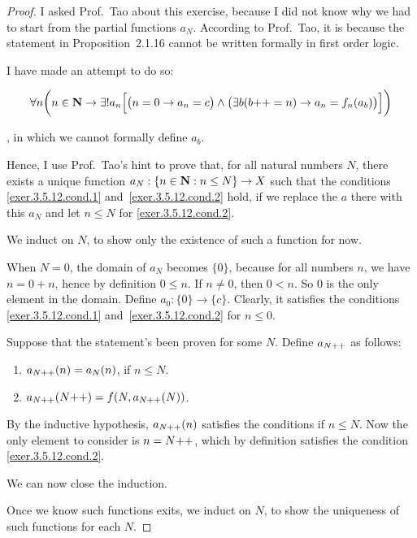 \noindent{}
\begin{proof}
	I asked Prof.~Tao about this exercise, because I did not know why we had to start from the partial functions $a_N$. According to Prof.~Tao, it is because the statement in Proposition~2.1.16 cannot be written formally in first order logic.
	
	I have made an attempt to do so:
		
	\begin{equation}
		\forall n\bigg(n \in \mathbf{N} \to \exists!a_n\Bigl[\bigl(n = 0 \to a_n = c\bigr) \wedge \bigl(\exists b(b{+}{+} = n) \to a_n = f_n(a_b)\bigr)\Bigr]\bigg) \label{prop.2.1.16.formal.stat.1}
	\end{equation}
	
	, in which we cannot formally define $a_b$.
	
	Hence, I use Prof.~Tao's hint to prove that, for all natural numbers $N$, there exists a unique function $a_N : \{n \in \mathbf{N} : n \le N\} \to X$ such that the conditions \eqref{exer.3.5.12.cond.1} and~\eqref{exer.3.5.12.cond.2} hold, if we replace the $a$ there with this $a_N$ and let $n \le N$ for \eqref{exer.3.5.12.cond.2}.
	
	 We induct on $N$, to show only the existence of such a function for now.
	
	\mybcbox When $N = 0$, the domain of $a_N$ becomes $\{0\}$, because for all numbers $n$, we have $n = 0 + n$, hence by definition $0 \le n$. If $n \ne 0$, then $0 < n$. So $0$ is the only element in the domain. Define $a_0: \{0\} \to \{c\}$. Clearly, it satisfies the conditions \eqref{exer.3.5.12.cond.1} and~\eqref{exer.3.5.12.cond.2} for $n \le 0$.
	
	\myisbox Suppose that the statement's been proven for some $N$. Define $a_{N{+}{+}}$ as follows:
	\begin{enumerate}
		\item $a_{N{+}{+}}(n) = a_N(n)$, if $n \le N$.
		\item $a_{N{+}{+}}(N{+}{+}) = f(N,a_{N{+}{+}}(N))$.
	\end{enumerate}
	By the inductive hypothesis, $a_{N{+}{+}}(n)$ satisfies the conditions if $n \le N$. Now the only element to consider is $n = N{+}{+}$, which by definition satisfies the condition \eqref{exer.3.5.12.cond.2}.
	
	We can now close the induction. \hfill \qedsymbol
	
	 Once we know such functions exits, we induct on $N$, to show the uniqueness of such functions for each $N$.
	

\end{proof}
